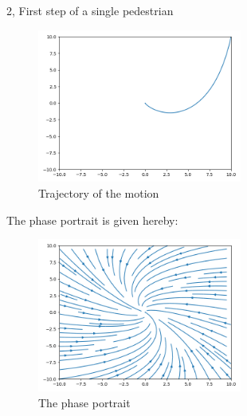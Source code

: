 \documentclass[10pt,a4paper]{article}
\begin{document}
\begin{task}{2, First step of a single pedestrian}
\begin{figure}[H]
\centering
\includegraphics[width=0.6\textwidth]{../plots/task2_part3.png}
\caption{Trajectory of the motion}
\label{fig:task2_3}
\end{figure}

The phase portrait is given hereby:
\begin{figure}[H]
\centering
\includegraphics[width=0.6\textwidth]{../plots/task2_part3_phase.png}
\caption{The phase portrait}
\label{fig:task2_3_phase}
\end{figure}

\end{task}
\end{document}
